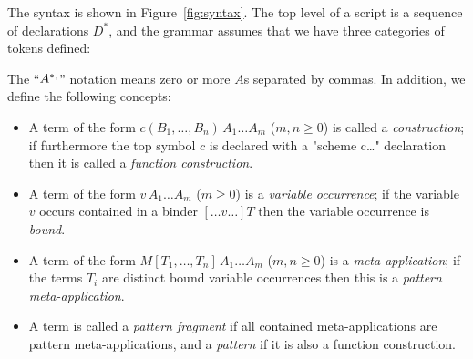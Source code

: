 \documentclass[letterpaper,11pt]{article}
\begin{document}
\begin{definition}
  The \hax syntax is shown in Figure~\ref{fig:syntax}. The top level of a \hax script is a sequence
  of declarations $D^*$, and the grammar assumes that we have three categories of tokens defined:
  The ``$A^{*\kw,}$'' notation means zero or more $A$s separated by commas. In addition, we define
  the following concepts:
  \begin{itemize}

  \item A term of the form $c(B_1,…,B_n)\,A_1…A_m$ ($m,n≥0$) is called a \emph{construction}; if
    furthermore the top symbol $c$ is declared with a "scheme c…" declaration then it is called a
    \emph{function construction}.

  \item A term of the form $v\,A_1…A_m$ ($m≥0$) is a \emph{variable occurrence}; if the variable $v$
    occurs contained in a binder $[…v…]T$ then the variable occurrence is \emph{bound}.

  \item A term of the form $M[T_1,…,T_n]\,A_1…A_m$ ($m,n≥0$) is a \emph{meta-application}; if the
    terms $T_i$ are distinct bound variable occurrences then this is a \emph{pattern
      meta-application}.

  \item A term is called a \emph{pattern fragment} if all contained meta-applications are pattern
    meta-applications, and a \emph{pattern} if it is also a function construction.

  \end{itemize}
\end{definition}
\end{document}
